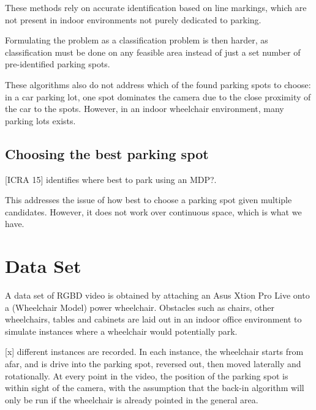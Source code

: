 These methods rely on accurate identification based on line markings, which are
not present in indoor environments not purely dedicated to parking. 

Formulating the problem as a classification problem is then harder, as
classification must be done on any feasible area instead of just a set number of
pre-identified parking spots.

These algorithms also do not address which of the found parking spots to choose:
in a car parking lot, one spot dominates the camera due to the close proximity
of the car to the spots. However, in an indoor wheelchair environment, many
parking lots exists.


\subsection{Choosing the best parking spot}
[ICRA 15] identifies where best to park using an MDP?.

This addresses the issue of how best to choose a parking spot given multiple
candidates. However, it does not work over continuous space, which is what we
have.



\section{Data Set}
\label{sec:rgbddataset}
A data set of RGBD video is obtained by attaching an Asus Xtion Pro Live onto a
(Wheelchair Model) power wheelchair. Obstacles such as chairs, other
wheelchairs, tables and cabinets are laid out in an indoor office environment to
simulate instances where a wheelchair would potentially park.

[x] different instances are recorded. In each instance, the wheelchair starts
from afar, and is drive into the parking spot, reversed out, then moved
laterally and rotationally. At every point in the video, the position of the
parking spot is within sight of the camera, with the assumption that the back-in
algorithm will only be run if the wheelchair is already pointed in the general
area.

